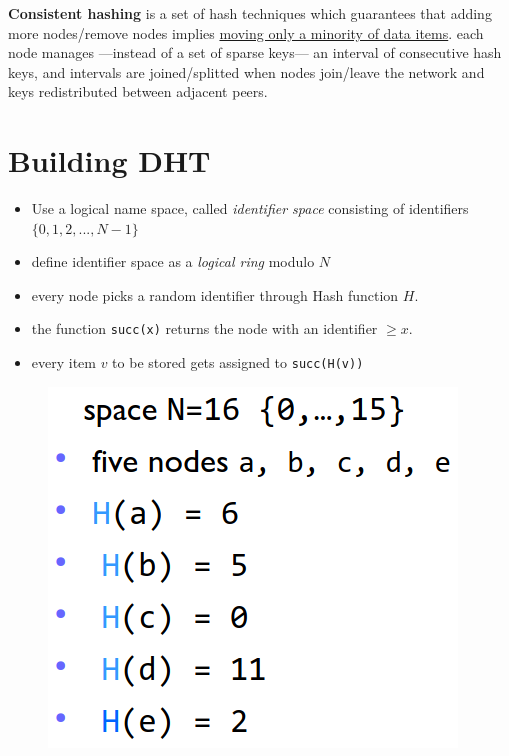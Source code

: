 \textbf{Consistent hashing} is a set of hash techniques which guarantees that adding more nodes/remove nodes implies \ul{moving only a minority of data items}.
each node manages ---instead of a set of sparse keys--- an interval of consecutive hash keys, and intervals are joined/splitted when nodes join/leave the network and keys redistributed between adjacent peers.


\section{Building DHT}
\begin{paracol}{2}
   \begin{itemize}
      \item Use a logical name space, called \textit{identifier space} consisting of identifiers
      $\{0,1,2,...,N-1\}$
      \item define identifier space as a \textit{logical ring} modulo $N$
      \item every node picks a random identifier
      through Hash function $H$.
      \item the function \texttt{succ(x)} returns the node with an identifier $\geq x$.
      \item every item $v$ to be stored gets assigned to \texttt{succ(H(v))}
   \end{itemize}
   \begin{figure}[htbp]
      \centering
      \includegraphics{images/DHT_build2.png}
      \label{fig:DHT_build2}
   \end{figure}

   \switchcolumn
   

\end{paracol}
